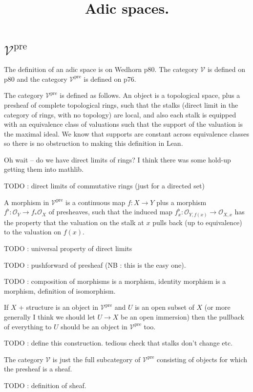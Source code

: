 \documentclass{amsart}
\DeclareMathOperator{\pre}{pre}
\theoremstyle{plain}
\theoremstyle{remark}
\begin{document}
\title{Adic spaces.}

\section{$\mathcal{V}^{\pre}$}

The definition of an adic space is on Wedhorn p80. The category $\mathcal{V}$ is defined on p80 and the category $\mathcal{V}^{\pre}$ is defined on p76.

The category $\mathcal{V}^{\pre}$ is defined as follows. An object is a topological space, plus a presheaf of complete topological rings, such that the stalks (direct limit in the category of rings, with no topology) are local, and also each stalk is equipped with an equivalence class of valuations such that the support of the valuation is the maximal ideal. We know that supports are constant across equivalence classes so there is no obstruction to making this definition in Lean.

Oh wait -- do we have direct limits of rings? I think there was some hold-up getting them into mathlib.

TODO : direct limits of commutative rings (just for a directed set)

A morphism in $\mathcal{V}^{\pre}$ is a continuous map $f:X\to Y$ plus a morphism $f^\flat:\mathcal{O}_Y\to f_*\mathcal{O}_X$ of presheaves, such that the induced map $f^\flat_x:\mathcal{O}_{Y,f(x)}\to\mathcal{O}_{X,x}$ has the property that the valuation on the stalk at $x$ pulls back (up to equivalence) to the valuation on $f(x)$.

TODO : universal property of direct limits

TODO : pushforward of presheaf (NB : this is the easy one).

TODO : composition of morphisms is a morphism, identity morphism is a morphism, definition of isomorphism.

If $X$ + structure is an object in $\mathcal{V}^{\pre}$ and $U$ is an open subset of $X$ (or more generally I think we should let $U\to X$ be an open immersion) then the pullback of everything to $U$ should be an object in $\mathcal{V}^{\pre}$ too.

TODO : define this construction. tedious check that stalks don't change etc.

The category $\mathcal{V}$ is just the full subcategory of $\mathcal{V}^{\pre}$ consisting of objects for which the presheaf is a sheaf.

TODO : definition of sheaf.
\end{document}

